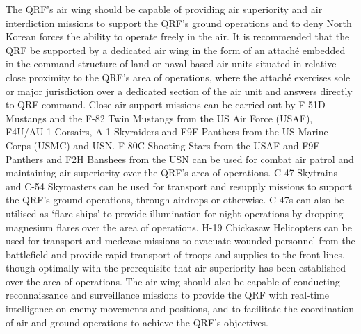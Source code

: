 \documentclass[a4paper,12pt]{article}
\begin{document}
{	The QRF's air wing should be capable of providing air superiority and air interdiction missions to support the QRF's ground operations and to deny North Korean forces the ability to operate freely in the air. It is recommended that the QRF be supported by a dedicated air wing in the form of an attaché embedded in the command structure of land or naval-based air units situated in relative close proximity to the QRF's area of operations, where the attaché exercises sole or major jurisdiction over a dedicated section of the air unit and answers directly to QRF command. Close air support missions can be carried out by F-51D Mustangs and the F-82 Twin Mustangs from the US Air Force (USAF), F4U/AU-1 Corsairs, A-1 Skyraiders and F9F Panthers from the US Marine Corps (USMC) and USN. F-80C Shooting Stars from the USAF and F9F Panthers and F2H Banshees from the USN can be used for combat air patrol and maintaining air superiority over the QRF's area of operations. C-47 Skytrains and C-54 Skymasters can be used for transport and resupply missions to support the QRF's ground operations, through airdrops or otherwise. C-47s can also be utilised as `flare ships' to provide illumination for night operations by dropping magnesium flares over the area of operations. H-19 Chickasaw Helicopters can be used for transport and medevac missions to evacuate wounded personnel from the battlefield and provide rapid transport of troops and supplies to the front lines, though optimally with the prerequisite that air superiority has been established over the area of operations. The air wing should also be capable of conducting reconnaissance and surveillance missions to provide the QRF with real-time intelligence on enemy movements and positions, and to facilitate the coordination of air and ground operations to achieve the QRF's objectives.
}

\clearpage
\end{document}
